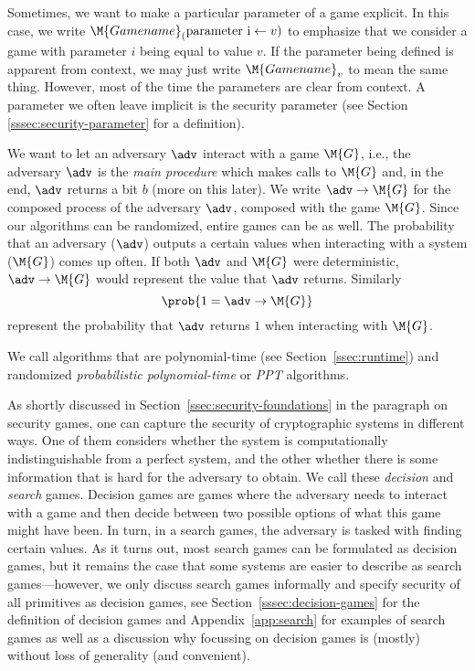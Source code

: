 Sometimes, we want to make a particular parameter of a game explicit. In this case, we write $\M{Gamename}_(\text{parameter i}\gets{v})$ to emphasize that we consider a game with parameter $i$ being equal to value $v$. If the parameter being defined is apparent from context, we may just write $\M{Gamename}_v$ to mean the same thing. However, most of the time the parameters are clear from context. A parameter we often leave implicit is the security parameter (see Section \ref{sssec:security-parameter} for a definition).

We want to let an adversary $\adv$ interact with a game $\M{G}$, i.e., the adversary $\adv$ is the \emph{main procedure} which makes calls to $\M{G}$ and, in the end, $\adv$ returns a bit $b$ (more on this later). We write $\adv\rightarrow\M{G}$ for the composed process of the adversary $\adv$, composed with the game $\M{G}$.
Since our algorithms can be randomized, entire games can be as well. The probability that an adversary ($\adv$) outputs a certain values when interacting with a system ($\M{G}$) comes up often. If both $\adv$ and $\M{G}$ were deterministic, $\adv \circ \M{G}$ would represent the value that $\adv$ returns. Similarly
\[\prob{1 = \adv \circ \M{G}}\]
represent the probability that $\adv$ returns $1$ when interacting with $\M{G}$.

We call algorithms that are polynomial-time (see Section~\ref{ssec:runtime}) and randomized \emph{probabilistic polynomial-time} or \emph{PPT} algorithms.

As shortly discussed in Section~\ref{ssec:security-foundations} in the paragraph on security games, one can capture the security of cryptographic systems in different ways. One of them considers whether the system is computationally indistinguishable from a perfect system, and the other whether there is some information that is hard for the adversary to obtain. We call these \emph{decision} and \emph{search} games. Decision games are games where the 
adversary needs to interact with a game and then decide between two possible options of what this game might have been. In turn, in a search games, the adversary is tasked with finding certain values. As it turns out, most search games
can be formulated as decision games, but it remains the case that some systems are easier to describe as search games---however, we only discuss search games informally and specify security of all primitives as decision games, see Section~\ref{sssec:decision-games} for the definition of decision games and Appendix~\ref{app:search} for examples of search games as well as a discussion why focussing on decision games is (mostly) without loss of generality (and convenient).

